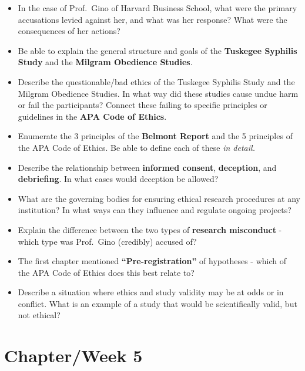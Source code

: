 \documentclass[
  12pt,
  letterpaper,
]{scrartcl}
\begin{document}
\begin{itemize}
\item
  In the case of Prof.~Gino of Harvard Business School, what were the
  primary accusations levied against her, and what was her response?
  What were the consequences of her actions?
\item
  Be able to explain the general structure and goals of the
  \textbf{Tuskegee Syphilis Study} and the \textbf{Milgram Obedience
  Studies}.
\item
  Describe the questionable/bad ethics of the Tuskegee Syphilis Study
  and the Milgram Obedience Studies. In what way did these studies cause
  undue harm or fail the participants? Connect these failing to specific
  principles or guidelines in the \textbf{APA Code of Ethics}.
\item
  Enumerate the 3 principles of the \textbf{Belmont Report} and the 5
  principles of the APA Code of Ethics. Be able to define each of these
  \emph{in detail.}
\item
  Describe the relationship between \textbf{informed consent},
  \textbf{deception}, and \textbf{debriefing}. In what cases would
  deception be allowed?
\item
  What are the governing bodies for ensuring ethical research procedures
  at any institution? In what ways can they influence and regulate
  ongoing projects?
\item
  Explain the difference between the two types of \textbf{research
  misconduct} - which type was Prof.~Gino (credibly) accused of?
\item
  The first chapter mentioned \textbf{``Pre-registration''} of
  hypotheses - which of the APA Code of Ethics does this best relate to?
\item
  Describe a situation where ethics and study validity may be at odds or
  in conflict. What is an example of a study that would be
  scientifically valid, but not ethical?
\end{itemize}

\section{Chapter/Week 5}\label{sec-ch-5}
\end{document}

